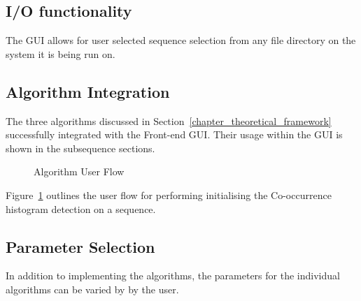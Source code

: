 \subsection{I/O functionality}
The GUI allows for user selected sequence selection from any file directory on
the system it is being run on.

\subsection{Algorithm Integration}
The three algorithms discussed in Section~\ref{chapter_theoretical_framework}
successfully integrated with the Front-end GUI. Their usage within the GUI is
shown in the subsequence sections.

\begin{figure}
    \caption{Algorithm User Flow\label{fig:gui_CHD}}
\end{figure}

Figure~\ref{fig:gui_CHD} outlines the user flow for performing initialising the
Co-occurrence histogram detection on a sequence.


\subsection{Parameter Selection}
In addition to implementing the algorithms, the parameters for the individual
algorithms can be varied by by the user.


